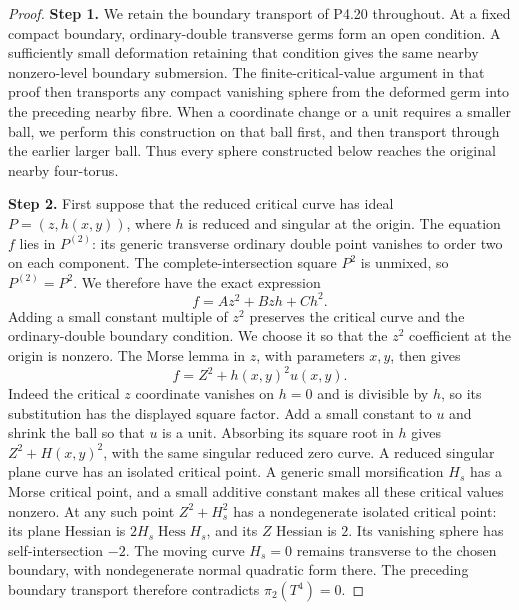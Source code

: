 \begin{proof}
\noindent\textbf{Step 1.} We retain the boundary transport of P4.20 throughout. At a fixed
compact boundary, ordinary-double transverse germs form an open
condition. A sufficiently small deformation retaining that
condition gives the same nearby nonzero-level boundary
submersion. The finite-critical-value argument in that proof
then transports any compact vanishing sphere from the deformed
germ into the preceding nearby fibre. When a coordinate change
or a unit requires a smaller ball, we perform this construction
on that ball first, and then transport through the earlier
larger ball. Thus every sphere constructed below reaches the
original nearby four-torus.

\noindent\textbf{Step 2.} First suppose that the reduced critical curve has ideal
$P=(z,h(x,y))$, where $h$ is reduced and singular at the
origin. The equation $f$ lies in $P^{(2)}$: its generic
transverse ordinary double point vanishes to order two on
each component. The complete-intersection square $P^2$ is
unmixed, so $P^{(2)}=P^2$. We therefore have the exact expression
\[
 f=A z^2+Bzh+Ch^2.
\]
Adding a small constant multiple of $z^2$ preserves the critical
curve and the ordinary-double boundary condition. We choose it
so that the $z^2$ coefficient at the origin is nonzero. The
Morse lemma in $z$, with parameters $x,y$, then gives
\[
 f=Z^2+h(x,y)^2u(x,y).
\]
Indeed the critical $z$ coordinate vanishes on $h=0$ and
is divisible by $h$, so its substitution has the displayed
square factor. Add a small constant to $u$ and shrink the
ball so that $u$ is a unit. Absorbing its square root in $h$
gives $Z^2+H(x,y)^2$, with the same singular reduced zero
curve. A reduced singular plane curve has an isolated critical
point. A generic small morsification $H_s$ has a Morse critical
point, and a small additive constant makes all these critical
values nonzero. At any such point $Z^2+H_s^2$ has a
nondegenerate isolated critical point: its plane Hessian is
$2H_s\operatorname{Hess}H_s$, and its $Z$ Hessian is $2$.
Its vanishing sphere has self-intersection $-2$.
The moving curve $H_s=0$ remains transverse to the chosen
boundary, with nondegenerate normal quadratic form there.
The preceding boundary transport therefore contradicts
$\pi_2(T^4)=0$.


\end{proof}

